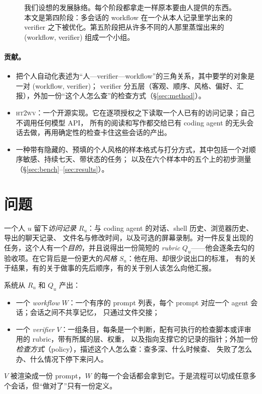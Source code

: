 \documentclass[10pt,UTF8,scheme=plain]{ctexart}
\newcommand{\sys}{\textsc{ht2wv}}
\begin{document}
\begin{figure}[t]
\centering

\caption{我们设想的发展脉络。每个阶段都拿走一样原本要由人提供的东西。本文是第四阶段：多会话的 workflow
在一个从本人记录里学出来的 verifier 之下被优化。第五阶段把从许多不同的人那里蒸馏出来的 (workflow, verifier) 组成一个小组。}
\label{fig:ladder}
\end{figure}

\paragraph{贡献。}
\begin{itemize}
\item 把个人自动化表述为“人—verifier—workflow”的三角关系，其中要学的对象是一对 (workflow, verifier)；
      verifier 分五层（客观、顺序、风格、偏好、汇报），外加一份“这个人怎么查”的检查方式（\S\ref{sec:method}）。
\item \sys{}：一个开源实现。它在逐项授权之下读取一个人已有的访问记录；自己不调用任何模型 API，
      所有的阅读和写作都交给已有 coding agent 的无头会话去做，再用确定性的检查卡住这些会话的产出。
\item 一种带有隐藏的、预填的个人风格的样本格式与打分方式，其中包括一个对顺序敏感、持续七天、带状态的任务；
      以及在六个样本中的五个上的初步测量（\S\ref{sec:bench}--\ref{sec:results}）。
\end{itemize}

\section{问题}
\label{sec:problem}

一个人 $u$ 留下\emph{访问记录} $R_u$：与 coding agent 的对话、shell 历史、浏览器历史、导出的聊天记录、
文件名与修改时间，以及可选的屏幕录制。对一件反复出现的任务，这个人有一个\emph{目的}，并且说得出一份简短的
\emph{rubric} $Q_u$——他会逐条去勾的验收项。在它背后是一份更大的\emph{风格} $S_u$：他在用、却很少说出口的标准，
有的关于结果，有的关于做事的先后顺序，有的关于别人该怎么向他汇报。

系统从 $R_u$ 和 $Q_u$ 产出：
\begin{itemize}
\item 一个 \emph{workflow} $W$：一个有序的 prompt 列表，每个 prompt 对应一个 agent 会话；会话之间不共享记忆，
      只通过文件交接；
\item 一个 \emph{verifier} $V$：一组条目，每条是一个判断，配有可执行的检查脚本或评审用的 rubric，带有所属的层、权重，
      以及指向支撑它的记录的指针；外加一份\emph{检查方式}（policy），描述这个人怎么查：查多深、什么时候查、
      失败了怎么办、什么情况下停下来问人。
\end{itemize}
$V$ 被渲染成一份 prompt，$W$ 的每一个会话都会拿到它。于是流程可以切成任意多个会话，但“做对了”只有一份定义。
\end{document}
